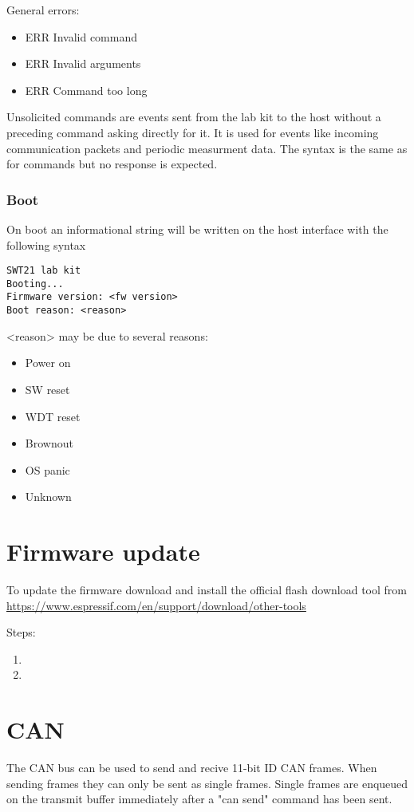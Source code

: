 \documentclass{article}[a4paper]
\begin{document}
General errors:
\begin{itemize}[noitemsep]
\item ERR Invalid command
\item ERR Invalid arguments
\item ERR Command too long
\end{itemize}

Unsolicited commands are events sent from the lab kit to the host without a
preceding command asking directly for it. It is used for events like incoming
communication packets and periodic measurment data. The syntax is the same as
for commands but no response is expected.

\subsubsection{Boot}
On boot an informational string will be written on the host interface with
the following syntax

\begin{verbatim}
SWT21 lab kit
Booting...
Firmware version: <fw version>
Boot reason: <reason>
\end{verbatim}

<reason> may be due to several reasons:
\begin{itemize}[noitemsep]
\item Power on
\item SW reset
\item WDT reset
\item Brownout
\item OS panic
\item Unknown
\end{itemize}

\section{Firmware update}
To update the firmware download and install the official flash download tool from
\url{https://www.espressif.com/en/support/download/other-tools}

Steps:
\begin{enumerate}
\item
\item
\end{enumerate}

\section{CAN}
The CAN bus can be used to send and recive 11-bit ID CAN frames.
When sending frames they can only be sent as single frames. Single frames are
enqueued on the transmit buffer immediately after a "can send" command has been sent.
\end{document}

